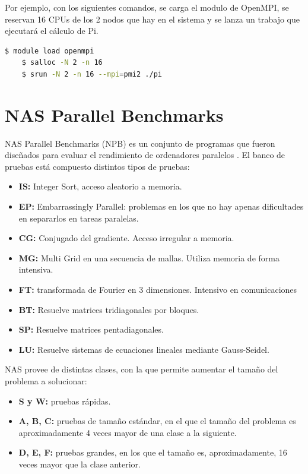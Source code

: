 Por ejemplo, con los siguientes comandos, se carga el modulo de OpenMPI, se reservan 16 CPUs de los 2 nodos que hay en el sistema y se lanza un trabajo que ejecutará el cálculo de Pi.

\vspace{2mm}
\begin{lstlisting}[language=bash]
    $ module load openmpi
    $ salloc -N 2 -n 16
    $ srun -N 2 -n 16 --mpi=pmi2 ./pi
\end{lstlisting}
\vspace{2mm}

\section{NAS Parallel Benchmarks}
NAS Parallel Benchmarks (NPB) es un conjunto de programas que fueron diseñados para evaluar el rendimiento de ordenadores paralelos \cite{nasbenchmark}. El banco de pruebas está compuesto distintos tipos de pruebas:

\begin{itemize}
    \item \textbf{IS: } Integer Sort, acceso aleatorio a memoria.
    \item \textbf{EP: } Embarrassingly Parallel: problemas en los que no hay apenas dificultades en separarlos en tareas paralelas.
    \item \textbf{CG:} Conjugado del gradiente. Acceso irregular a memoria.
    \item \textbf{MG: } Multi Grid en una secuencia de mallas. Utiliza memoria de forma intensiva.
    \item \textbf{FT: } transformada de Fourier en 3 dimensiones. Intensivo en comunicaciones
    \item \textbf{BT:} Resuelve matrices tridiagonales por bloques.
    \item \textbf{SP: } Resuelve matrices pentadiagonales.
    \item \textbf{LU: } Resuelve sistemas de ecuaciones lineales mediante Gauss-Seidel.
\end{itemize}
\vspace{2mm}

NAS provee de distintas clases, con la que permite aumentar el tamaño del problema a solucionar:
\begin{itemize}
    \item \textbf{S y W: } pruebas rápidas.
    \item \textbf{A, B, C:} pruebas de tamaño estándar, en el que el tamaño del problema es aproximadamente 4 veces mayor de una clase a la siguiente.
    \item \textbf{D, E, F:} pruebas grandes, en los que el tamaño es, aproximadamente, 16 veces mayor que la clase anterior.
\end{itemize}
\vspace{2mm}

